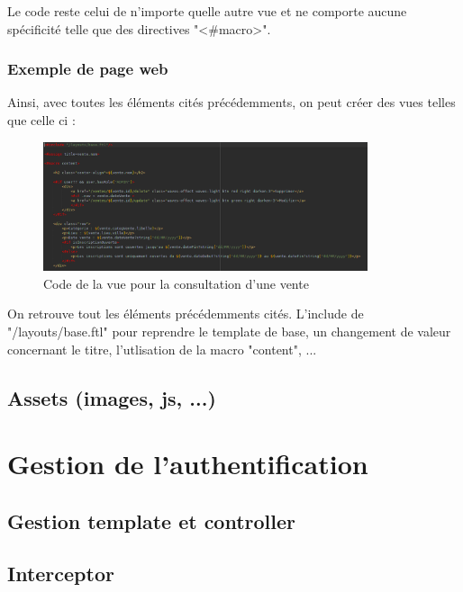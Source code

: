 				Le code reste celui de n'importe quelle autre vue et ne comporte aucune spécificité telle que des directives "<\#macro>".

			\subsubsection{Exemple de page web}

				Ainsi, avec toutes les éléments cités précédemments, on peut créer des vues telles que celle ci :

				\begin{figure}[H]
					\centering\includegraphics[width=0.85\textwidth, keepaspectratio]{res/view-venteConsulter.png}
					\caption{Code de la vue pour la consultation d'une vente}
				\end{figure}

				On retrouve tout les éléments précédemments cités. L'include de "/layouts/base.ftl" pour reprendre le template de base, un changement de valeur concernant le titre, l'utlisation de la macro "content", ...

		\subsection{Assets (images, js, ...)}


	\section{Gestion de l'authentification}

		\subsection{Gestion template et controller}


		\subsection{Interceptor}


